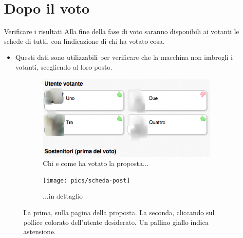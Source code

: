 \documentclass{beamer}
\begin{document}
\section{Dopo il voto}
\begin{frame}{Verificare i risultati}
Alla fine della fase di voto saranno disponibili ai votanti le schede di tutti, con l\`indicazione di chi ha votato cosa.

\begin{itemize}\item Questi dati sono utilizzabili per verificare che la macchina non imbrogli i votanti, scegliendo al loro posto.\end{itemize}
\begin{figure}
	\begin{subfigure}[b]{.58\textwidth}
		\includegraphics[width=\textwidth,]{pics/voters}
		\caption{Chi e come ha votato la proposta...}
	\end{subfigure}
	\begin{subfigure}[b]{.34\textwidth}
		\texttt{[image: pics/scheda-post]}
		\caption{...in dettaglio}
	\end{subfigure}
\caption{La prima, sulla pagina della proposta. La seconda, cliccando sul pollice colorato dell'utente desiderato. Un pallino giallo indica astensione.}
\end{figure}
\end{frame}
\end{document}
